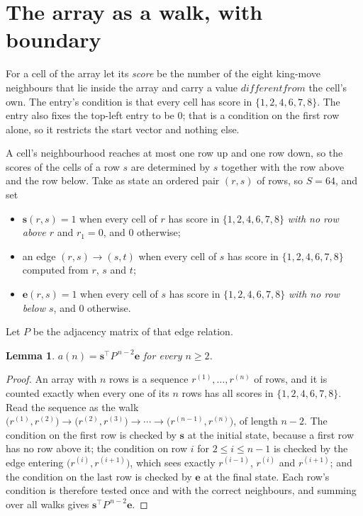 \documentclass[11pt,a4paper]{article}
\theoremstyle{plain}
\newtheorem{lemma}[theorem]{Lemma}
\theoremstyle{definition}
\begin{document}
\section{The array as a walk, with boundary}

For a cell of the array let its \emph{score} be the number of the eight king-move neighbours that lie inside
the array and carry a value $different from$ the cell's own. The entry's condition is that every cell
has score in $\{1,2,4,6,7,8\}$. The entry also fixes the top-left entry to be $0$; that is a condition on the first row alone, so it restricts the start vector and nothing else.

A cell's neighbourhood reaches at most one row up and one row down, so the scores of the
cells of a row $s$ are determined by $s$ together with the row above and the row below.
Take as state an ordered pair $(r,s)$ of rows, so $S=64$, and set
\begin{itemize}
\item $\mathbf{s}(r,s)=1$ when every cell of $r$ has score in $\{1,2,4,6,7,8\}$ \emph{with no row
above $r$} and $r_1=0$, and $0$ otherwise;
\item an edge $(r,s)\to(s,t)$ when every cell of $s$ has score in $\{1,2,4,6,7,8\}$ computed from
$r$, $s$ and $t$;
\item $\mathbf{e}(r,s)=1$ when every cell of $s$ has score in $\{1,2,4,6,7,8\}$ \emph{with no row
below $s$}, and $0$ otherwise.
\end{itemize}
Let $P$ be the adjacency matrix of that edge relation.

\begin{lemma}\label{lem:walk}
$a(n)=\mathbf{s}^{\!\top}P^{\,n-2}\mathbf{e}$ for every $n\ge2$.
\end{lemma}

\begin{proof}
An array with $n$ rows is a sequence $r^{(1)},\dots,r^{(n)}$ of rows, and it is counted
exactly when every one of its $n$ rows has all scores in $\{1,2,4,6,7,8\}$. Read the sequence as the
walk $\bigl(r^{(1)},r^{(2)}\bigr)\to\bigl(r^{(2)},r^{(3)}\bigr)\to\cdots\to
\bigl(r^{(n-1)},r^{(n)}\bigr)$, of length $n-2$. The condition on the first row is
checked by $\mathbf{s}$ at the initial state, because a first row has no row above it; the
condition on row $i$ for $2\le i\le n-1$ is checked by the edge entering
$\bigl(r^{(i)},r^{(i+1)}\bigr)$, which sees exactly $r^{(i-1)}$, $r^{(i)}$ and
$r^{(i+1)}$; and the condition on the last row is checked by $\mathbf{e}$ at the final
state. Each row's condition is therefore tested once and with the correct neighbours, and
summing over all walks gives $\mathbf{s}^{\!\top}P^{\,n-2}\mathbf{e}$.
\end{proof}
\end{document}
